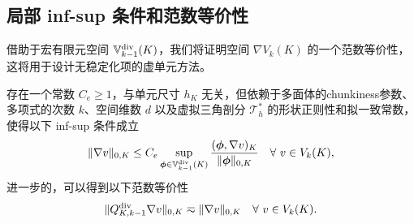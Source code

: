 \subsection{局部 inf-sup 条件和范数等价性}
借助于宏有限元空间 $\mathbb{V}_{k-1}^{\rm div}(K)$，我们将证明空间 $\nabla V_k(K)$
的一个范数等价性，这将用于设计无稳定化项的虚单元方法。
\begin{lemma}\label{lem:gradVknormequivalence}
存在一个常数 $C_e\geq1$，与单元尺寸 $h_K$
无关，但依赖于多面体的chunkiness参数、多项式的次数 $k$、空间维数 $d$ 以及虚拟三角剖分 $\mathcal T^*_h$ 的形状正则性和拟一致常数，使得以下 inf-sup 条件成立
\begin{equation}\label{eq:localdiscreteinfsup}    
\|\nabla v\|_{0,K}\leq C_e\sup_{\boldsymbol{\phi}\in\mathbb{V}_{k-1}^{\rm div}(K)}\frac{(\boldsymbol{\phi}, \nabla v)_K}{\|\boldsymbol{\phi}\|_{0,K}} \quad \forall~v\in V_k(K),
\end{equation}
进一步的，可以得到以下范数等价性
\begin{equation}\label{eq:gradVknormequivalence}  
\|Q_{K,k-1}^{\operatorname{div}}\nabla v\|_{0,K}\eqsim \|\nabla v\|_{0,K} \quad \forall~v\in V_k(K).
\end{equation}
\end{lemma}
